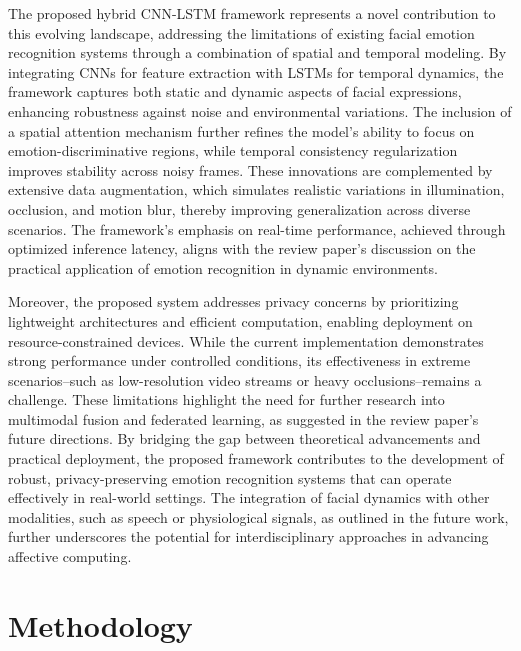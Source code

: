 \documentclass[conference]{IEEEtran}
\begin{document}
The proposed hybrid CNN-LSTM framework represents a novel contribution to this evolving landscape, addressing the limitations of existing facial emotion recognition systems through a combination of spatial and temporal modeling. By integrating CNNs for feature extraction with LSTMs for temporal dynamics, the framework captures both static and dynamic aspects of facial expressions, enhancing robustness against noise and environmental variations. The inclusion of a spatial attention mechanism further refines the model's ability to focus on emotion-discriminative regions, while temporal consistency regularization improves stability across noisy frames. These innovations are complemented by extensive data augmentation, which simulates realistic variations in illumination, occlusion, and motion blur, thereby improving generalization across diverse scenarios. The framework's emphasis on real-time performance, achieved through optimized inference latency, aligns with the review paper's discussion on the practical application of emotion recognition in dynamic environments.  

Moreover, the proposed system addresses privacy concerns by prioritizing lightweight architectures and efficient computation, enabling deployment on resource-constrained devices. While the current implementation demonstrates strong performance under controlled conditions, its effectiveness in extreme scenarios--such as low-resolution video streams or heavy occlusions--remains a challenge. These limitations highlight the need for further research into multimodal fusion and federated learning, as suggested in the review paper's future directions. By bridging the gap between theoretical advancements and practical deployment, the proposed framework contributes to the development of robust, privacy-preserving emotion recognition systems that can operate effectively in real-world settings. The integration of facial dynamics with other modalities, such as speech or physiological signals, as outlined in the future work, further underscores the potential for interdisciplinary approaches in advancing affective computing.

\section{Methodology}
\end{document}
